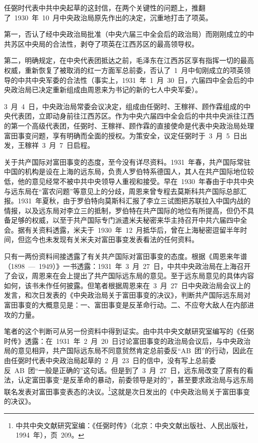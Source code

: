 任弼时代表中共中央起草的这封信，在两个关键性的问题上，推翻了~1930~年~10~月中央政治局原先作出的决定，沉重地打击了项英。

第一，否认了经中央政治局批准（中央六届三中全会后的政治局）而刚刚成立的中共苏区中央局的合法性，剥夺了项英在江西苏区的最高领导权。

第二，明确规定，在中央代表团抵达之前，毛泽东在江西苏区享有指挥一切的最高权威，重新恢复了被取消的红一方面军总前委，否认了~1~月中旬刚成立的项英领导的中共中央军委的合法性（事实上，1931~年~1~月~30~日，六届四中全会后的中央政治局已决定重新组成由周恩来为书记的新的七人中央军委）。

3~月~4~日，中央政治局常委会议决定，组成由任弼时、王稼祥、顾作霖组成的中央代表团，立即动身前往江西苏区。作为中央六届四中全会后的中共中央派往江西的第一个高级代表团，任弼时、王稼祥、顾作霖的直接使命是代表中央政治局处理富田事变问题，享有明确而全面的授权。为策安全，议定任弼时于~3~月~5~日出发，王稼祥~3~月~7~日启程。

关于共产国际对富田事变的态度，至今没有详尽资料。1931~年春，共产国际常驻中国的机构是设在上海的远东局，负责人罗伯特系德国人，其人在共产国际地位较低，他的意见经常不被中共中央领导人重视和接受。早在~1930~年春由于中共中央与远东局在“富农问题”等意见上的分歧，周恩来曾专程去莫斯科共产国际总部汇报。1931~年夏秋，由于罗伯特向莫斯科汇报了李立三试图把苏联拉入中国内战的情报，以及远东局对李立三的抵制，罗伯特在共产国际的地位有所提高，但仍不具备足够的权威，以至于共产国际专门派遣米夫秘密来华主持召开中共六届四中全会。据有关资料透露，米夫于~1930~年~12~月抵华后，曾在上海秘密逗留半年时间，但迄今也未发现有关米夫对富田事变发表看法的任何资料。

只有一两份资料间接透露了有关共产国际对富田事变的态度。根据《周恩来年谱（1898~—~1949）》一书透露：1931~年~3~月~27~日，中共中央政治局在上海召开了会议，周恩来在会上提出了共产国际远东局的意见。至于远东局意见的具体内容如何，该书未作任何披露。但笔者根据周恩来在~3~月~27~日中央政治局会议上的发言，和次日发表的《中央政治局关于富田事变的决议》，判断共产国际远东局对富田事变的大概意见是：一、富田事变是反革命行动。二、不应夸大敌人在内部进攻的力量。

笔者的这个判断可从另一份资料中得到证实。由中共中央文献研究室编写的《任弼时传》透露：在~1931~年~2~月~20~日讨论富田事变的政治局会议后，与中央政治局的意见相异，共产国际远东局不同意贸然肯定总前委反“AB~团”的行动，因此在由任弼时代表中央政治局起草的~2~月~23~日的信中，没有写上总前委反~AB~团“一般是正确的”这句话。但是到了~3~月~27~日，远东局改变了原有的看法，认定富田事变“是反革命的暴动，前委领导是对的”，甚至要求政治局与远东局联名发表对富田事变表态的决议。\footnote{中共中央文献研究室编：《任弼时传》（北京：中央文献出版社、人民出版社，1994~年），页~209。}这就是次日发出的《中央政治局关于富田事变的决议》。

